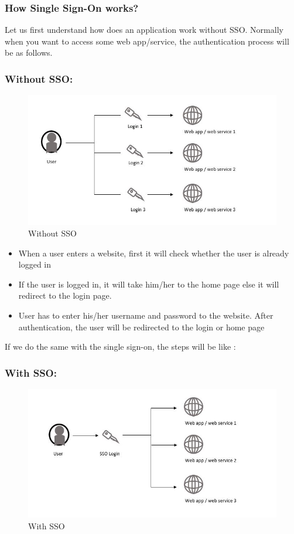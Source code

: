 \documentclass{report}
\begin{document}
\subsubsection*{How Single Sign-On works?}
Let us first understand how does an application work without SSO.
Normally when you want to access some web app/service, the authentication process will be as follows.

\subsubsection*{Without SSO:}
\begin{figure}[h]
	\centerline{\includegraphics{newwithoutsso.jpg}}
	\caption{Without SSO}
	\label{Without SSO}
\end{figure}

\begin{itemize}
	\item{When a user enters a website, first it will check whether the user is already logged in}
	\item{If the user is logged in, it will take him/her to the home page else it will redirect to the login page.}
	\item{User has to enter his/her username and password to the website. After authentication, the user will be redirected to the login or home page}
\end{itemize}

If we do the same with the single sign-on, the steps will be like :

\subsubsection*{With SSO:}
\begin{figure}[h]
	\centerline{\includegraphics{newwithsso.jpg}}
	\caption{With SSO}
	\label{With SSO}
\end{figure}
\end{document}
